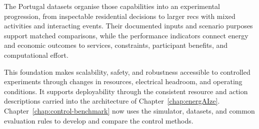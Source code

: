 The Portugal datasets organise those capabilities into an experimental progression, from inspectable residential decisions to larger \glspl{rec} with mixed activities and interacting events. Their documented inputs and scenario purposes support matched comparisons, while the performance indicators connect energy and economic outcomes to services, constraints, participant benefits, and computational effort.

This foundation makes scalability, safety, and robustness accessible to controlled experiments through changes in resources, electrical headroom, and operating conditions. It supports deployability through the consistent resource and action descriptions carried into the architecture of Chapter~\ref{chap:energAIze}. Chapter~\ref{chap:control-benchmark} now uses the simulator, datasets, and common evaluation rules to develop and compare the control methods.
\endgroup
